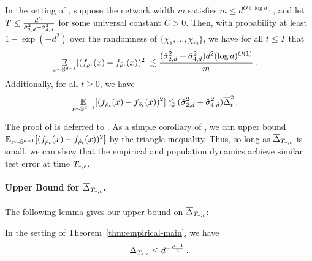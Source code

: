 \begin{lemma}\label{lemma:finite_sample_width_main_lemma}
In the setting of , suppose the network width $m$ satisfies $m \leq d^{O(\log d)}$, and let $T \leq \frac{d^C}{\hat{\sigma}_{2, d}^2 + \hat{\sigma}_{4, d}^2}$ for some universal constant $C > 0$. Then, with probability at least $1 - \exp(-d^2)$ over the randomness of $\{\chi_1, \ldots, \chi_m\}$, we have for all $t \leq T$ that
\begin{align}
\operatorname*{\mathbb{E}}_{x \sim \mathbb{S}^{d - 1}} [(f_{\rho_t}(x) - f_{{\bar{\rho}}_t}(x))^2]
& \lesssim \frac{(\hat{\sigma}_{2, d}^2 + \hat{\sigma}_{4, d}^2) d^2 (\log d)^{O(1)}}{m} \,.
\end{align}
Additionally, for all $t \geq 0$, we have
\begin{align}
\operatorname*{\mathbb{E}}_{x \sim \mathbb{S}^{d - 1}} [(f_{{\hat{\rho}}_t}(x) - f_{{\bar{\rho}}_t}(x))^2]
& \lesssim (\hat{\sigma}_{2, d}^2 + \hat{\sigma}_{4, d}^2) \overline{\Delta}_t^2 \,.
\end{align}
\end{lemma}

The proof of  is deferred to . As a simple corollary of , we can upper bound $\operatorname*{\mathbb{E}}_{x\sim\mathbb{S}^{d-1}}[(f_{\rho_t}(x)-f_{{\hat{\rho}}_t}(x))^2]$ by the triangle inequality. Thus, so long as $\overline{\Delta}_{T_{*, \epsilon}}$ is small, we can show that the empirical and population dynamics achieve similar test error at time $T_{*, \epsilon}$.

\paragraph{Upper Bound for $\overline{\Delta}_{T_{*, \epsilon}}$.} The following lemma gives our upper bound on $\overline{\Delta}_{T_{*, \epsilon}}$:

\begin{lemma} 
	\label{lemma:final_bound_Delta_avg}
     In the setting of Theorem~\ref{thm:empirical-main}, we have
	\begin{align}
		\overline{\Delta}_{T_{*, \epsilon}}\le d^{-\frac{\mu-1}{4}} \,.
	\end{align}	
\end{lemma}



